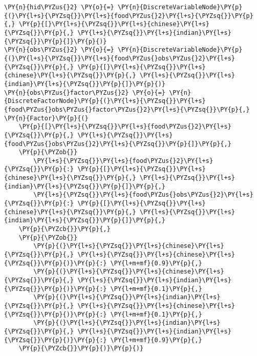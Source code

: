 \begin{example}
\begin{Verbatim}[commandchars=\\\{\}, fontsize=\relsize{-1}]
\PY{n}{hid\PYZus{}2} \PY{o}{=} \PY{n}{DiscreteVariableNode}\PY{p}{(}\PY{l+s}{\PYZsq{}}\PY{l+s}{food\PYZus{}2}\PY{l+s}{\PYZsq{}}\PY{p}{,} \PY{p}{[}\PY{l+s}{\PYZsq{}}\PY{l+s}{chinese}\PY{l+s}{\PYZsq{}}\PY{p}{,} \PY{l+s}{\PYZsq{}}\PY{l+s}{indian}\PY{l+s}{\PYZsq{}}\PY{p}{]}\PY{p}{)}
\PY{n}{obs\PYZus{}2} \PY{o}{=} \PY{n}{DiscreteVariableNode}\PY{p}{(}\PY{l+s}{\PYZsq{}}\PY{l+s}{food\PYZus{}obs\PYZus{}2}\PY{l+s}{\PYZsq{}}\PY{p}{,} \PY{p}{[}\PY{l+s}{\PYZsq{}}\PY{l+s}{chinese}\PY{l+s}{\PYZsq{}}\PY{p}{,} \PY{l+s}{\PYZsq{}}\PY{l+s}{indian}\PY{l+s}{\PYZsq{}}\PY{p}{]}\PY{p}{)}
\PY{n}{obs\PYZus{}factor\PYZus{}2} \PY{o}{=} \PY{n}{DiscreteFactorNode}\PY{p}{(}\PY{l+s}{\PYZsq{}}\PY{l+s}{food\PYZus{}obs\PYZus{}factor\PYZus{}2}\PY{l+s}{\PYZsq{}}\PY{p}{,} \PY{n}{Factor}\PY{p}{(}
    \PY{p}{[}\PY{l+s}{\PYZsq{}}\PY{l+s}{food\PYZus{}2}\PY{l+s}{\PYZsq{}}\PY{p}{,} \PY{l+s}{\PYZsq{}}\PY{l+s}{food\PYZus{}obs\PYZus{}2}\PY{l+s}{\PYZsq{}}\PY{p}{]}\PY{p}{,}
    \PY{p}{\PYZob{}}
        \PY{l+s}{\PYZsq{}}\PY{l+s}{food\PYZus{}2}\PY{l+s}{\PYZsq{}}\PY{p}{:} \PY{p}{[}\PY{l+s}{\PYZsq{}}\PY{l+s}{chinese}\PY{l+s}{\PYZsq{}}\PY{p}{,} \PY{l+s}{\PYZsq{}}\PY{l+s}{indian}\PY{l+s}{\PYZsq{}}\PY{p}{]}\PY{p}{,}
        \PY{l+s}{\PYZsq{}}\PY{l+s}{food\PYZus{}obs\PYZus{}2}\PY{l+s}{\PYZsq{}}\PY{p}{:} \PY{p}{[}\PY{l+s}{\PYZsq{}}\PY{l+s}{chinese}\PY{l+s}{\PYZsq{}}\PY{p}{,} \PY{l+s}{\PYZsq{}}\PY{l+s}{indian}\PY{l+s}{\PYZsq{}}\PY{p}{]}\PY{p}{,}
    \PY{p}{\PYZcb{}}\PY{p}{,}
    \PY{p}{\PYZob{}}
        \PY{p}{(}\PY{l+s}{\PYZsq{}}\PY{l+s}{chinese}\PY{l+s}{\PYZsq{}}\PY{p}{,} \PY{l+s}{\PYZsq{}}\PY{l+s}{chinese}\PY{l+s}{\PYZsq{}}\PY{p}{)}\PY{p}{:} \PY{l+m+mf}{0.9}\PY{p}{,}
        \PY{p}{(}\PY{l+s}{\PYZsq{}}\PY{l+s}{chinese}\PY{l+s}{\PYZsq{}}\PY{p}{,} \PY{l+s}{\PYZsq{}}\PY{l+s}{indian}\PY{l+s}{\PYZsq{}}\PY{p}{)}\PY{p}{:} \PY{l+m+mf}{0.1}\PY{p}{,}
        \PY{p}{(}\PY{l+s}{\PYZsq{}}\PY{l+s}{indian}\PY{l+s}{\PYZsq{}}\PY{p}{,} \PY{l+s}{\PYZsq{}}\PY{l+s}{chinese}\PY{l+s}{\PYZsq{}}\PY{p}{)}\PY{p}{:} \PY{l+m+mf}{0.1}\PY{p}{,}
        \PY{p}{(}\PY{l+s}{\PYZsq{}}\PY{l+s}{indian}\PY{l+s}{\PYZsq{}}\PY{p}{,} \PY{l+s}{\PYZsq{}}\PY{l+s}{indian}\PY{l+s}{\PYZsq{}}\PY{p}{)}\PY{p}{:} \PY{l+m+mf}{0.9}\PY{p}{,}
    \PY{p}{\PYZcb{}}\PY{p}{)}\PY{p}{)}


\end{Verbatim}
\end{example}
